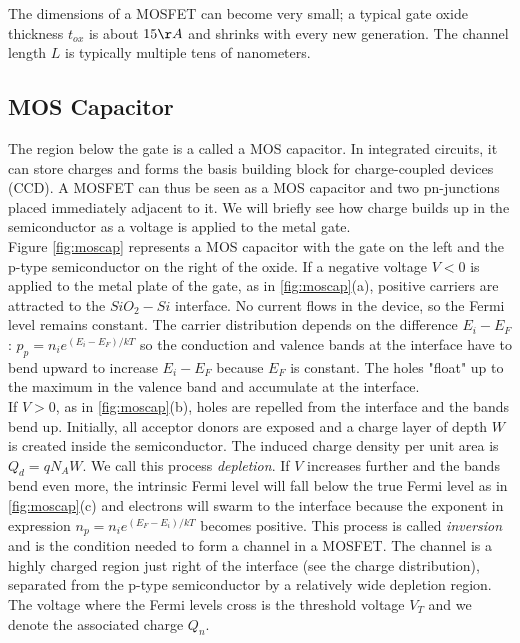 The dimensions of a MOSFET can become very small; a typical gate oxide thickness $t_{ox}$ is about $15 \AA$ and shrinks with every new generation. The channel length $L$ is typically multiple tens of nanometers.

\subsection{MOS Capacitor}
The region below the gate is a called a MOS capacitor. In integrated circuits, it can store charges and forms the basis building block for charge-coupled devices (CCD). A MOSFET can thus be seen as a MOS capacitor and two pn-junctions placed immediately adjacent to it. We will briefly see how charge builds up in the semiconductor as a voltage is applied to the metal gate.\\
Figure  \ref{fig:moscap} represents a MOS capacitor with the gate on the left and the p-type semiconductor on the right of the oxide. If a negative voltage $V < 0$ is applied to the metal plate of the gate, as in \ref{fig:moscap}(a), positive carriers are attracted to the $SiO_2 - Si$ interface. No current flows in the device, so the Fermi level remains constant. The carrier distribution depends on the difference $E_i - E_F$: $p_p = n_i e^{(E_i - E_F)/kT}$ so the conduction and valence bands at the interface have to bend upward to increase $E_i - E_F$ because $E_F$ is constant. The holes "float" up to the maximum in the valence band and accumulate at the interface.\\
If $V > 0$, as in  \ref{fig:moscap}(b), holes are repelled from the interface and the bands bend up. Initially, all acceptor donors are exposed and a charge layer of depth $W$ is created inside the semiconductor. The induced charge density per unit area is $Q_d = q N_A W$. We call this process \emph{depletion}. If $V$ increases further and the bands bend even more, the intrinsic Fermi level will fall below the true Fermi level as in \ref{fig:moscap}(c) and electrons will swarm to the interface because the exponent in expression $n_p = n_i e^{(E_F - E_i)/kT}$ becomes positive. This process is called \emph{inversion} and is the condition needed to form a channel in a MOSFET. The channel is a highly charged region just right of the interface (see the charge distribution), separated from the p-type semiconductor by a relatively wide depletion region. The voltage where the Fermi levels cross is the threshold voltage $V_T$ and we denote the associated charge $Q_n$.
